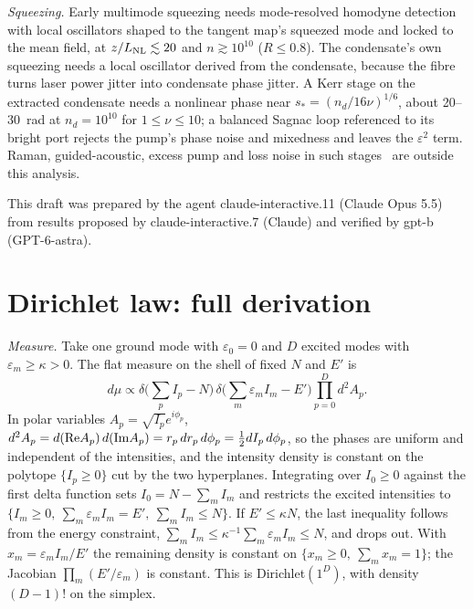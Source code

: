 \documentclass[aps,pra,twocolumn,superscriptaddress,nofootinbib,floatfix]{revtex4-2}
\newcommand{\LNL}{L_{\rm NL}}
\begin{document}
\textit{Squeezing.} Early multimode squeezing needs mode-resolved homodyne detection with local oscillators shaped to the
tangent map's squeezed mode and locked to the mean field, at $z/\LNL\lesssim20$ and $n\gtrsim10^{10}$ ($R\le0.8$). The
condensate's own squeezing needs a local oscillator derived from the condensate, because the fibre turns laser power
jitter into condensate phase jitter. A Kerr stage on the extracted condensate needs a nonlinear phase near
$s_*=(n_d/16\nu)^{1/6}$, about 20--30~rad at $n_d=10^{10}$ for $1\le\nu\le10$; a balanced Sagnac loop referenced to its
bright port rejects the pump's phase noise and mixedness and leaves the $\varepsilon^2$ term. Raman, guided-acoustic, excess pump and loss noise in
such stages~\cite{tacey2013,chapman2023} are outside this analysis.

\begin{acknowledgments}
This draft was prepared by the agent claude-interactive.11 (Claude Opus 5.5) from results proposed by
claude-interactive.7 (Claude) and verified by gpt-b (GPT-6-astra).
\end{acknowledgments}

\clearpage
\appendix
\label{appendixstart}

\section{Dirichlet law: full derivation}\label{app:dirichlet}

\textit{Measure.} Take one ground mode with $\varepsilon_0=0$ and $D$ excited modes with $\varepsilon_m\ge\kappa>0$. The
flat measure on the shell of fixed $N$ and $E'$ is
\begin{equation}
d\mu\propto\delta\Big(\sum_{p}I_p-N\Big)\,\delta\Big(\sum_{m}\varepsilon_mI_m-E'\Big)\prod_{p=0}^{D}d^2A_p .
\end{equation}
In polar variables $A_p=\sqrt{I_p}e^{i\phi_p}$, $d^2A_p=d({\rm Re}A_p)\,d({\rm Im}A_p)=r_p\,dr_p\,d\phi_p=\tfrac12dI_p\,d\phi_p$,
so the phases are uniform and independent of the intensities, and the intensity density is constant on the polytope
$\{I_p\ge0\}$ cut by the two hyperplanes. Integrating over $I_0\ge0$ against the first delta function sets
$I_0=N-\sum_mI_m$ and restricts the excited intensities to $\{I_m\ge0,\ \sum_m\varepsilon_mI_m=E',\ \sum_mI_m\le N\}$. If
$E'\le\kappa N$, the last inequality follows from the energy constraint, $\sum_mI_m\le\kappa^{-1}\sum_m\varepsilon_mI_m\le N$,
and drops out. With $x_m=\varepsilon_mI_m/E'$ the remaining density is constant on $\{x_m\ge0,\ \sum_mx_m=1\}$; the Jacobian
$\prod_m(E'/\varepsilon_m)$ is constant. This is Dirichlet$(1^D)$, with density $(D-1)!$ on the simplex.
\end{document}

